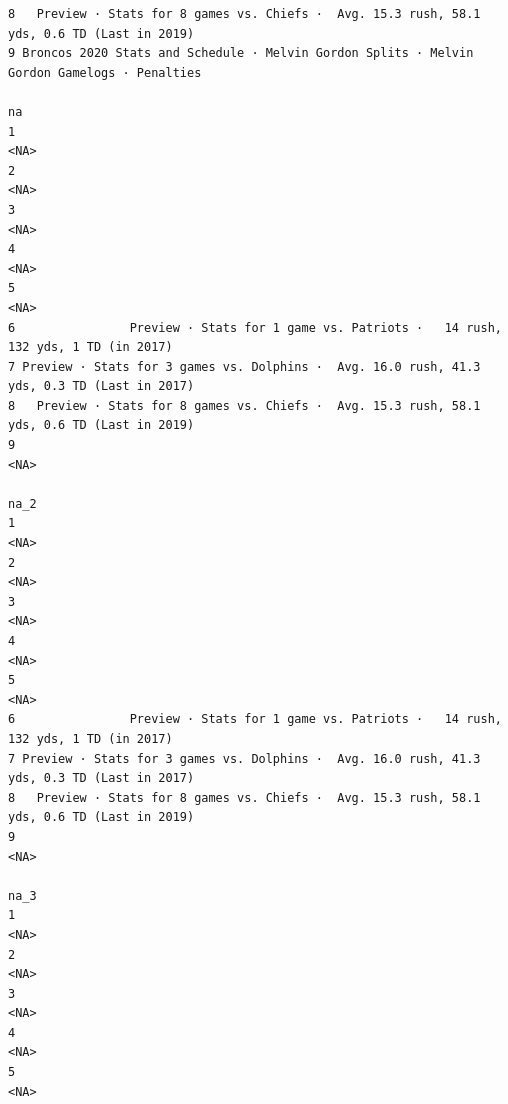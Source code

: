 \documentclass[
]{article}
\begin{document}
\begin{verbatim}
8   Preview · Stats for 8 games vs. Chiefs ·  Avg. 15.3 rush, 58.1 yds, 0.6 TD (Last in 2019)
9 Broncos 2020 Stats and Schedule · Melvin Gordon Splits · Melvin Gordon Gamelogs · Penalties
                                                                                           na
1                                                                                        <NA>
2                                                                                        <NA>
3                                                                                        <NA>
4                                                                                        <NA>
5                                                                                        <NA>
6                Preview · Stats for 1 game vs. Patriots ·   14 rush, 132 yds, 1 TD (in 2017)
7 Preview · Stats for 3 games vs. Dolphins ·  Avg. 16.0 rush, 41.3 yds, 0.3 TD (Last in 2017)
8   Preview · Stats for 8 games vs. Chiefs ·  Avg. 15.3 rush, 58.1 yds, 0.6 TD (Last in 2019)
9                                                                                        <NA>
                                                                                         na_2
1                                                                                        <NA>
2                                                                                        <NA>
3                                                                                        <NA>
4                                                                                        <NA>
5                                                                                        <NA>
6                Preview · Stats for 1 game vs. Patriots ·   14 rush, 132 yds, 1 TD (in 2017)
7 Preview · Stats for 3 games vs. Dolphins ·  Avg. 16.0 rush, 41.3 yds, 0.3 TD (Last in 2017)
8   Preview · Stats for 8 games vs. Chiefs ·  Avg. 15.3 rush, 58.1 yds, 0.6 TD (Last in 2019)
9                                                                                        <NA>
                                                                                         na_3
1                                                                                        <NA>
2                                                                                        <NA>
3                                                                                        <NA>
4                                                                                        <NA>
5                                                                                        <NA>

\end{verbatim}
\end{document}
